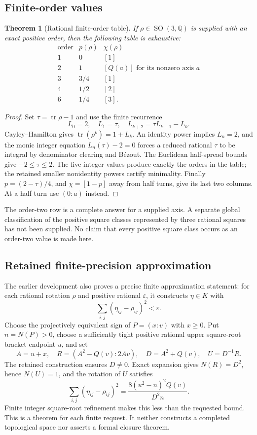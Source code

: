 \documentclass[11pt]{article}
\newcommand{\Q}{\mathbb Q}
\newcommand{\SO}{\operatorname{SO}}
\newcommand{\tr}{\operatorname{tr}}
\newtheorem{theorem}{Theorem}[section]
\theoremstyle{remark}
\begin{document}
\subsection{Finite-order values}

\begin{theorem}[Rational finite-order table]
If \(\rho\in\SO(3,\Q)\) is supplied with an exact positive order, then
the following table is exhaustive:
\[
\begin{array}{c|c|c}
\text{order}&p(\rho)&\chi(\rho)\\\hline
1&0&[1]\\
2&1&[Q(a)]\text{ for its nonzero axis }a\\
3&3/4&[1]\\
4&1/2&[2]\\
6&1/4&[3].
\end{array}
\]
\end{theorem}
\begin{proof}
Set \(\tau=\tr\rho-1\) and use the finite recurrence
\[
 L_0=2,\quad L_1=\tau,\quad L_{k+2}=\tau L_{k+1}-L_k.
\]
Cayley--Hamilton gives \(\tr(\rho^k)=1+L_k\). An identity power implies
\(L_n=2\), and the monic integer equation \(L_n(\tau)-2=0\) forces a
reduced rational \(\tau\) to be integral by denominator clearing and
B\'ezout. The Euclidean half-spread bounds give \(-2\le\tau\le2\).
The five integer values produce exactly the orders in the table; the
retained smaller nonidentity powers certify minimality. Finally
\(p=(2-\tau)/4\), and \(\chi=[1-p]\) away from half turns, give its last
two columns. At a half turn use \((0:a)\) instead.
\end{proof}

The order-two row is a complete answer for a supplied axis. A separate global
classification of the positive square classes represented by three rational
squares has not been supplied. No claim that every positive square class
occurs as an order-two value is made here.

\subsection{Retained finite-precision approximation}

The earlier development also proves a precise finite approximation statement:
for each rational rotation \(\rho\) and positive rational \(\varepsilon\),
it constructs \(\eta\in K\) with
\[
 \sum_{i,j}(\eta_{ij}-\rho_{ij})^2<\varepsilon.
\]
Choose the projectively equivalent sign of \(P=(x:v)\) with \(x\ge0\).
Put \(n=N(P)>0\), choose a sufficiently tight positive rational upper
square-root bracket endpoint \(u\), and set
\[
 A=u+x,\quad R=(A^2-Q(v):2Av),\quad D=A^2+Q(v),\quad U=D^{-1}R.
\]
The retained construction ensures \(D\ne0\). Exact expansion gives
\(N(R)=D^2\), hence \(N(U)=1\), and the rotation of \(U\) satisfies
\[
 \sum_{i,j}(\eta_{ij}-\rho_{ij})^2
 =\frac{8(u^2-n)^2Q(v)}{D^2n}.
\]
Finite integer square-root refinement makes this less than the requested
bound. This is a theorem for each finite request. It neither constructs a
completed topological space nor asserts a formal closure theorem.
\end{document}

